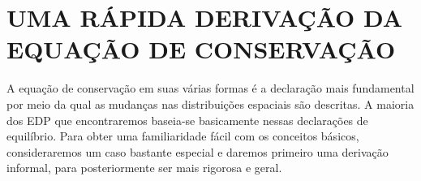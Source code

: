 \section{UMA RÁPIDA DERIVAÇÃO DA EQUAÇÃO DE CONSERVAÇÃO}


A equação de conservação em suas várias formas é a declaração mais fundamental por meio da qual as mudanças nas distribuições espaciais são descritas. A maioria dos EDP que encontraremos baseia-se basicamente nessas declarações de equilíbrio. Para obter uma familiaridade fácil com os conceitos básicos, consideraremos um caso bastante especial e daremos primeiro uma derivação informal, para posteriormente ser mais rigorosa e geral.

